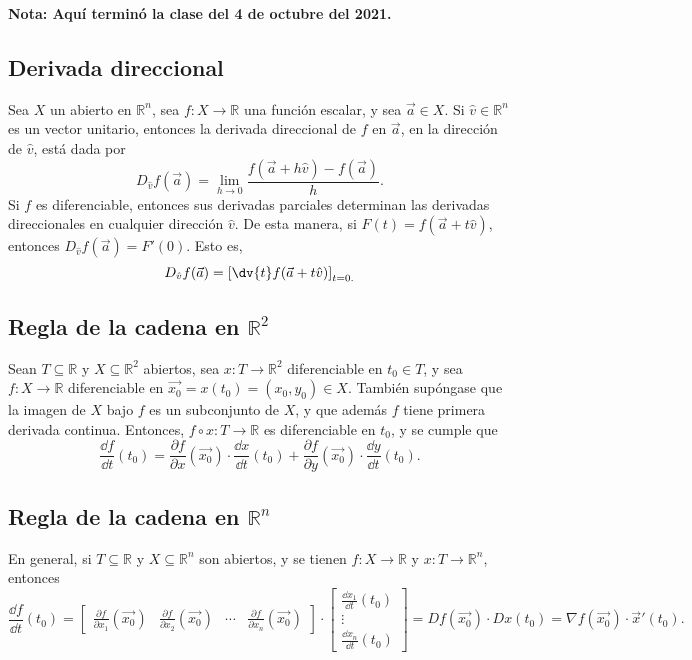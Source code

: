 \documentclass{article}
\begin{document}
\vspace{10pt}
\textbf{Nota: Aquí terminó la clase del 4 de octubre del 2021.}

\subsection*{Derivada direccional}

Sea $X$ un abierto en $\mathbb{R}^n$, sea $f:X\to\mathbb{R}$ una función escalar, y sea $\vec{a}\in X$. Si $\hat{v}\in\mathbb{R}^n$ es un vector unitario, entonces la derivada direccional de $f$ en $\vec{a}$, en la dirección de $\hat{v}$, está dada por
$$D_{\hat{v}}f(\vec{a})=\lim_{h\to0}\frac{f(\vec{a}+h\hat{v})-f(\vec{a})}{h}.$$
Si $f$ es diferenciable, entonces sus derivadas parciales determinan las derivadas direccionales en cualquier dirección $\hat{v}$. De esta manera, si $F(t)=f(\vec{a}+t\hat{v})$, entonces $D_{\hat{v}}f(\vec{a})=F'(0)$. Esto es,
$$D_{\hat{v}}f(\vec{a})=\left[\dv{t}f(\vec{a}+t\hat{v})\right]_{t=0.}$$

\subsection*{Regla de la cadena en $\mathbb{R}^2$}

Sean $T\subseteq\mathbb{R}$ y $X\subseteq\mathbb{R}^2$ abiertos, sea $x:T\to\mathbb{R}^2$ diferenciable en $t_0\in T$, y sea $f:X\to\mathbb{R}$ diferenciable en $\vec{x_0}=x(t_0)=(x_0,y_0)\in X$. También supóngase que la imagen de $X$ bajo $f$ es un subconjunto de $X$, y que además $f$ tiene primera derivada continua. Entonces, $f\circ x: T\to\mathbb{R}$ es diferenciable en $t_0$, y se cumple que
$$\frac{\dd{f}}{\dd{t}}(t_0)=\frac{\partial{f}}{\partial{x}}(\vec{x_0})\cdot\frac{\dd{x}}{\dd{t}}(t_0)+\frac{\partial{f}}{\partial{y}}(\vec{x_0})\cdot\frac{\dd{y}}{\dd{t}}(t_0).$$

\subsection*{Regla de la cadena en $\mathbb{R}^n$}

En general, si $T\subseteq\mathbb{R}$ y $X\subseteq\mathbb{R}^n$ son abiertos, y se tienen $f:X\to\mathbb{R}$ y $x:T\to\mathbb{R}^n$, entonces
$$\frac{\dd{f}}{\dd{t}}(t_0)=
\begin{bmatrix}
\displaystyle\frac{\partial{f}}{\partial{x_1}}(\vec{x_0})& \displaystyle\frac{\partial{f}}{\partial{x_2}}(\vec{x_0})& \cdots &\displaystyle\frac{\partial{f}}{\partial{x_n}}(\vec{x_0})
\end{bmatrix}\cdot
\begin{bmatrix}
\displaystyle\frac{\dd{x_1}}{\dd{t}}(t_0)\\ \vdots \\ \displaystyle\frac{\dd{x_n}}{\dd{t}}(t_0)
\end{bmatrix}=Df(\vec{x_0})\cdot Dx(t_0)=\nabla f(\vec{x_0})\cdot \vec{x}'(t_0).$$
\end{document}
